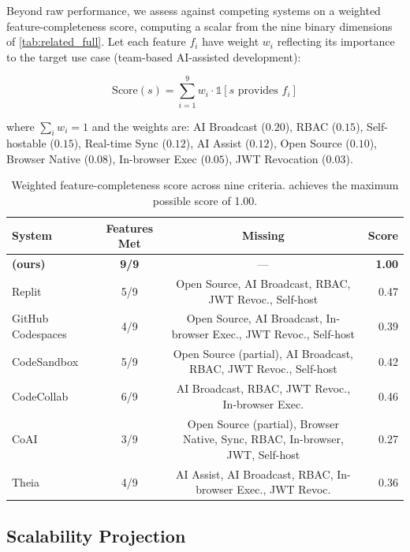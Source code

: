 Beyond raw performance, we assess \echoray{} against competing systems on
a weighted feature-completeness score, computing a scalar from the nine binary
dimensions of \cref{tab:related_full}. Let each feature $f_i$ have weight
$w_i$ reflecting its importance to the target use case (team-based
AI-assisted development):

\begin{equation}
  \text{Score}(s) = \sum_{i=1}^{9} w_i \cdot \mathbb{1}[s \text{ provides } f_i]
  \label{eq:feature_score}
\end{equation}

\noindent where $\sum_i w_i = 1$ and the weights are:
AI Broadcast ($0.20$), RBAC ($0.15$), Self-hostable ($0.15$),
Real-time Sync ($0.12$), AI Assist ($0.12$), Open Source ($0.10$),
Browser Native ($0.08$), In-browser Exec ($0.05$), JWT Revocation ($0.03$).

\begin{table}[H]
  \centering
  \caption{Weighted feature-completeness score across nine criteria.
    \echoray{} achieves the maximum possible score of 1.00.}
  \label{tab:feature_score}
  \setlength{\tabcolsep}{5pt}
  \renewcommand{\arraystretch}{1.1}
  \begin{tabular}{lccr}
    \toprule
    \textbf{System} & \textbf{Features Met} & \textbf{Missing} & \textbf{Score} \\
    \midrule
    \textbf{\echoray{} (ours)} & \textbf{9/9} & --- & \textbf{1.00} \\
    Replit              & 5/9 & Open Source, AI Broadcast, RBAC, JWT Revoc., Self-host & 0.47 \\
    GitHub Codespaces   & 4/9 & Open Source, AI Broadcast, In-browser Exec., JWT Revoc., Self-host & 0.39 \\
    CodeSandbox         & 5/9 & Open Source (partial), AI Broadcast, RBAC, JWT Revoc., Self-host & 0.42 \\
    CodeCollab~\cite{shen2025codecollab} & 6/9 & AI Broadcast, RBAC, JWT Revoc., In-browser Exec. & 0.46 \\
    CoAI~\cite{huang2025coai} & 3/9 & Open Source (partial), Browser Native, Sync, RBAC, In-browser, JWT, Self-host & 0.27 \\
    Theia               & 4/9 & AI Assist, AI Broadcast, RBAC, In-browser Exec., JWT Revoc. & 0.36 \\
    \bottomrule
  \end{tabular}
\end{table}

\subsection{Scalability Projection}
\label{sub:scalability}

